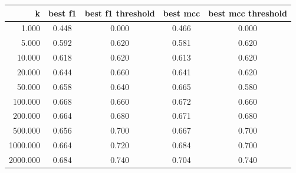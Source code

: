 \begin{tabular}{rcccc}
\toprule
k & best f1 & best f1 threshold & best mcc & best mcc threshold \\
\midrule
1.000 & 0.448 & 0.000 & 0.466 & 0.000 \\
5.000 & 0.592 & 0.620 & 0.581 & 0.620 \\
10.000 & 0.618 & 0.620 & 0.613 & 0.620 \\
20.000 & 0.644 & 0.660 & 0.641 & 0.620 \\
50.000 & 0.658 & 0.640 & 0.665 & 0.580 \\
100.000 & 0.668 & 0.660 & 0.672 & 0.660 \\
200.000 & 0.664 & 0.680 & 0.671 & 0.680 \\
500.000 & 0.656 & 0.700 & 0.667 & 0.700 \\
1000.000 & 0.664 & 0.720 & 0.684 & 0.700 \\
2000.000 & 0.684 & 0.740 & 0.704 & 0.740 \\
\bottomrule
\end{tabular}
